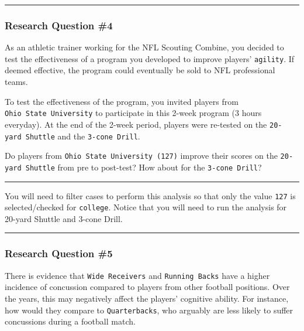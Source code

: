 \documentclass[
]{article}
\begin{document}
\begin{center}\rule{0.5\linewidth}{0.5pt}\end{center}

\hypertarget{research-question-4}{%
\subsubsection{Research Question \#4}\label{research-question-4}}

As an athletic trainer working for the NFL Scouting Combine, you decided to test the effectiveness of a program you developed to improve players' \texttt{agility}. If deemed effective, the program could eventually be sold to NFL professional teams.

To test the effectiveness of the program, you invited players from \texttt{Ohio\ State\ University} to participate in this 2-week program (3 hours everyday). At the end of the 2-week period, players were re-tested on the \texttt{20-yard\ Shuttle} and the \texttt{3-cone\ Drill}.

Do players from \texttt{Ohio\ State\ University\ (127)} improve their scores on the \texttt{20-yard\ Shuttle} from pre to post-test? How about for the \texttt{3-cone\ Drill}?

\begin{center}\rule{0.5\linewidth}{0.5pt}\end{center}

You will need to filter cases to perform this analysis so that only the value \texttt{127} is selected/checked for \texttt{college}. Notice that you will need to run the analysis for 20-yard Shuttle and 3-cone Drill.

\begin{center}\rule{0.5\linewidth}{0.5pt}\end{center}

\hypertarget{research-question-5}{%
\subsubsection{Research Question \#5}\label{research-question-5}}

There is evidence that \texttt{Wide\ Receivers} and \texttt{Running\ Backs} have a higher incidence of concussion compared to players from other football positions. Over the years, this may negatively affect the players' cognitive ability. For instance, how would they compare to \texttt{Quarterbacks}, who arguably are less likely to suffer concussions during a football match.
\end{document}
